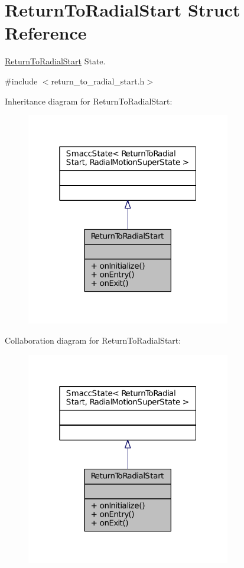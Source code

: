 \hypertarget{structReturnToRadialStart}{}\section{Return\+To\+Radial\+Start Struct Reference}
\label{structReturnToRadialStart}


\hyperlink{structReturnToRadialStart}{Return\+To\+Radial\+Start} State.  




{\ttfamily \#include $<$return\+\_\+to\+\_\+radial\+\_\+start.\+h$>$}



Inheritance diagram for Return\+To\+Radial\+Start\+:
\nopagebreak
\begin{figure}[H]
\begin{center}
\leavevmode
\includegraphics[width=253pt]{structReturnToRadialStart__inherit__graph}
\end{center}
\end{figure}


Collaboration diagram for Return\+To\+Radial\+Start\+:
\nopagebreak
\begin{figure}[H]
\begin{center}
\leavevmode
\includegraphics[width=253pt]{structReturnToRadialStart__coll__graph}
\end{center}
\end{figure}
